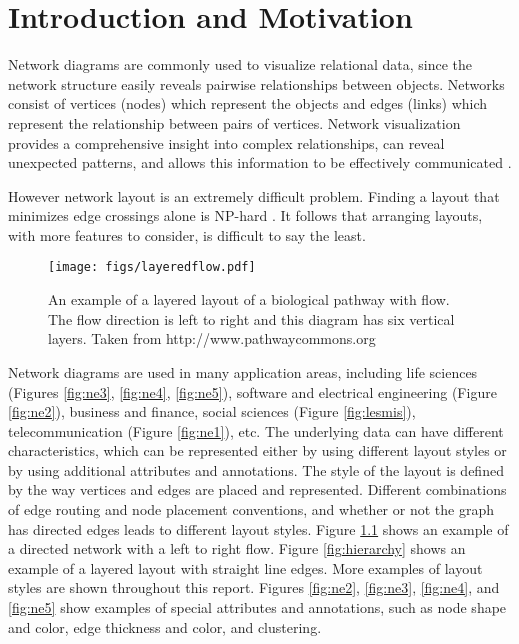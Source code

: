 \documentclass[a4paper,11pt,phdthesis,singlespace,twoside]{cssethesis}
\begin{document}
\mainmatter						%

\chapter{Introduction and Motivation} \label{intro}
\let\cleardoublepage\clearpage
Network diagrams are commonly used to visualize relational data, since the network structure easily reveals pairwise relationships between objects. 
Networks consist of vertices (nodes) which represent the objects and edges (links) which represent the relationship between pairs of vertices. 
Network visualization provides a comprehensive insight into complex relationships, can reveal unexpected patterns, and  allows this information to be effectively communicated \cite{kohlhammer2011solving}.

However network layout is an extremely difficult problem. Finding a layout that minimizes edge crossings alone is NP-hard \cite{eades1986edge}. It follows that arranging layouts, with more features to consider, is difficult to say the least.

\begin{figure}[H]
\begin{center}
\texttt{[image: figs/layeredflow.pdf]}
\end{center}
\caption{An example of a layered layout of a biological pathway with flow. The flow direction is left to right and this diagram has six vertical layers. Taken from http://www.pathwaycommons.org}
\label{fig:layeredflow}
\end{figure}

Network diagrams are used in many application areas, including life sciences (Figures \ref{fig:ne3}, \ref{fig:ne4}, \ref{fig:ne5}), software and electrical engineering (Figure \ref{fig:ne2}), business and finance, social sciences (Figure \ref{fig:lesmis}), telecommunication (Figure \ref{fig:ne1}), etc. 
The underlying data can have different characteristics, which can be represented either by using different layout styles or by using additional attributes and annotations. The style of the layout is defined by the way vertices and edges are placed and represented. Different combinations of edge routing and node placement conventions, and whether or not the graph has directed edges leads to different layout styles. Figure \ref{fig:layeredflow} shows an example of a directed network with a left to right flow. Figure \ref{fig:hierarchy} shows an example of a layered layout with straight line edges. More examples of layout styles are shown throughout this report. Figures \ref{fig:ne2}, \ref{fig:ne3}, \ref{fig:ne4}, and \ref{fig:ne5} show examples of special attributes and annotations, such as node shape and color, edge thickness and color, and clustering. 
\end{document}
